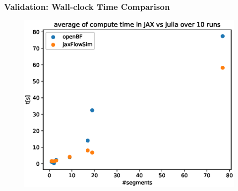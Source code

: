 \documentclass{beamer}
\begin{document}
\begin{frame}
	\frametitle{Validation: Wall-clock Time Comparison}
	\begin{figure} [H]
		\centering
		\includegraphics[width=0.94\columnwidth]{images/comparison.eps}
		\label{fig:comparison}
	\end{figure}

\end{frame}
\end{document}
